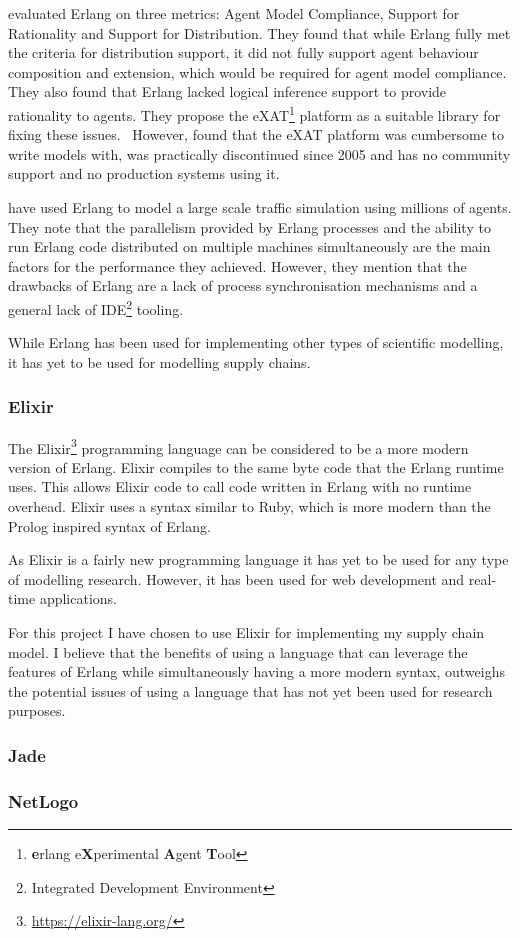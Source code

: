  evaluated Erlang on three metrics: Agent Model Compliance, Support for Rationality and Support for Distribution.
They found that while Erlang fully met the criteria for distribution support, it did not fully support agent behaviour composition and extension, which would be required for agent model compliance.
They also found that Erlang lacked logical inference support to provide rationality to agents.
They propose the eXAT\footnote{\textbf{e}rlang e\textbf{X}perimental \textbf{A}gent \textbf{T}ool} platform as a suitable library for fixing these issues.~\cite{di2003exat}
However,  found that the eXAT platform was cumbersome to write models with, was practically discontinued since 2005 and has no community support and no production systems using it.

 have used Erlang to model a large scale traffic simulation using millions of agents.
They note that the parallelism provided by Erlang processes and the ability to run Erlang code distributed on multiple machines simultaneously are the main factors for the performance they achieved.
However, they mention that the drawbacks of Erlang are a lack of process synchronisation mechanisms and a general lack of IDE\footnote{Integrated Development Environment} tooling.

While Erlang has been used for implementing other types of scientific modelling, it has yet to be used for modelling supply chains.

\subsubsection{Elixir}

The Elixir\footnote{\url{https://elixir-lang.org/}} programming language can be considered to be a more modern version of Erlang.
Elixir compiles to the same byte code that the Erlang runtime uses.
This allows Elixir code to call code written in Erlang with no runtime overhead.
Elixir uses a syntax similar to Ruby, which is more modern than the Prolog inspired syntax of Erlang.~\cite{loder2016erlang}

As Elixir is a fairly new programming language it has yet to be used for any type of modelling research.
However, it has been used for web development and real-time applications.

For this project I have chosen to use Elixir for implementing my supply chain model.
I believe that the benefits of using a language that can leverage the features of Erlang while simultaneously having a more modern syntax, outweighs the potential issues of using a language that has not yet been used for research purposes.

\subsubsection{Jade}

\subsubsection{NetLogo}
